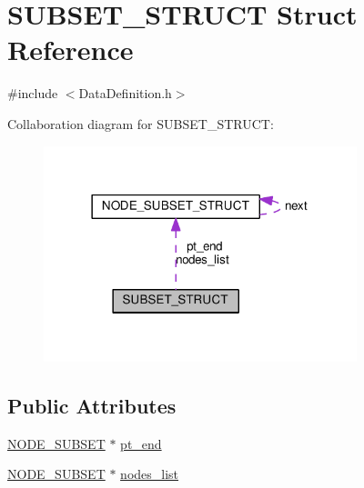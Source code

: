 \hypertarget{structSUBSET__STRUCT}{\section{S\-U\-B\-S\-E\-T\-\_\-\-S\-T\-R\-U\-C\-T Struct Reference}
\label{structSUBSET__STRUCT}
}


{\ttfamily \#include $<$Data\-Definition.\-h$>$}



Collaboration diagram for S\-U\-B\-S\-E\-T\-\_\-\-S\-T\-R\-U\-C\-T\-:
\nopagebreak
\begin{figure}[H]
\begin{center}
\leavevmode
\includegraphics[width=258pt]{structSUBSET__STRUCT__coll__graph}
\end{center}
\end{figure}
\subsection*{Public Attributes}
\begin{DoxyCompactItemize}
\item 
\hyperlink{DataDefinition_8h_a6c7c55bb5cf24ee7e388f70b7564be38}{N\-O\-D\-E\-\_\-\-S\-U\-B\-S\-E\-T} $\ast$ \hyperlink{structSUBSET__STRUCT_a8023cbde4ffe195b6fa3fd9a7c3211f6}{pt\-\_\-end}
\item 
\hyperlink{DataDefinition_8h_a6c7c55bb5cf24ee7e388f70b7564be38}{N\-O\-D\-E\-\_\-\-S\-U\-B\-S\-E\-T} $\ast$ \hyperlink{structSUBSET__STRUCT_a61f3350ae28b746fea56129536e73ec1}{nodes\-\_\-list}
\end{DoxyCompactItemize}



